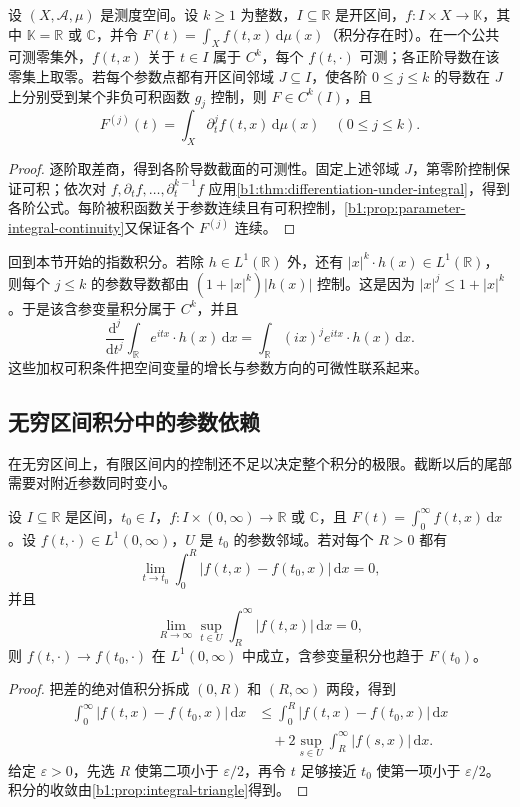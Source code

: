 \begin{corollary}
\label{b1:cor:higher-parameter-derivatives}
设 \((X,\mathcal A,\mu)\) 是测度空间。设 \(k\ge1\) 为整数，\(I\subseteq\mathbb R\) 是开区间，\(f:I\times X\to\mathbb K\)，其中 \(\mathbb K=\mathbb R\) 或 \(\mathbb C\)，并令 \(F(t)=\int_Xf(t,x)\,\mathrm d\mu(x)\)（积分存在时）。在一个公共可测零集外，\(f(t,x)\) 关于 \(t\in I\) 属于 \(C^k\)，每个 \(f(t,\cdot)\) 可测；各正阶导数在该零集上取零。若每个参数点都有开区间邻域 \(J\subseteq I\)，使各阶 \(0\leq j\leq k\) 的导数在 \(J\) 上分别受到某个非负可积函数 \(g_j\) 控制，则 \(F\in C^k(I)\)，且
\[
F^{(j)}(t)=\int_X\partial_t^j f(t,x)\,\mathrm d\mu(x)
\quad(0\leq j\leq k).
\]
\end{corollary}
\begin{proof}
逐阶取差商，得到各阶导数截面的可测性。固定上述邻域 \(J\)，第零阶控制保证可积；依次对 \(f,\partial_t f,\ldots,\partial_t^{k-1}f\) 应用\cref{b1:thm:differentiation-under-integral}，得到各阶公式。每阶被积函数关于参数连续且有可积控制，\cref{b1:prop:parameter-integral-continuity}又保证各个 \(F^{(j)}\) 连续。
\end{proof}

回到本节开始的指数积分。若除 \(h\in L^1(\mathbb R)\) 外，还有 \(|x|^k\cdot h(x)\in L^1(\mathbb R)\)，则每个 \(j\leq k\) 的参数导数都由 \((1+|x|^k)|h(x)|\) 控制。这是因为 \(|x|^j\leq1+|x|^k\)。于是该含参变量积分属于 \(C^k\)，并且
\[
\dfrac{\mathrm{d}^j}{\mathrm{d}t^j}\int_{\mathbb R}e^{itx}\cdot h(x)\,\mathrm dx
=\int_{\mathbb R}(ix)^j e^{itx}\cdot h(x)\,\mathrm dx.
\]
这些加权可积条件把空间变量的增长与参数方向的可微性联系起来。

\subsection{无穷区间积分中的参数依赖}
\label{b1:subsec:050404}

在无穷区间上，有限区间内的控制还不足以决定整个积分的极限。截断以后的尾部需要对附近参数同时变小。

\begin{proposition}
\label{b1:prop:parameter-uniform-tails}
设 \(I\subseteq\mathbb R\) 是区间，\(t_0\in I\)，\(f:I\times(0,\infty)\to\mathbb R\) 或 \(\mathbb C\)，且 \(F(t)=\int_0^\infty f(t,x)\,\mathrm dx\)。设 \(f(t,\cdot)\in L^1(0,\infty)\)，\(U\) 是 \(t_0\) 的参数邻域。若对每个 \(R>0\) 都有
\[
\lim_{t\to t_0}\int_0^R|f(t,x)-f(t_0,x)|\,\mathrm dx=0,
\]
并且
\[
\lim_{R\to\infty}\sup_{t\in U}\int_R^\infty|f(t,x)|\,\mathrm dx=0,
\]
则 \(f(t,\cdot)\to f(t_0,\cdot)\) 在 \(L^1(0,\infty)\) 中成立，含参变量积分也趋于 \(F(t_0)\)。
\end{proposition}
\begin{proof}
把差的绝对值积分拆成 \((0,R)\) 和 \((R,\infty)\) 两段，得到
\[
\begin{split}
\int_0^\infty|f(t,x)-f(t_0,x)|\,\mathrm dx
&\leq\int_0^R|f(t,x)-f(t_0,x)|\,\mathrm dx\\
&\quad+2\sup_{s\in U}\int_R^\infty|f(s,x)|\,\mathrm dx.
\end{split}
\]
给定 \(\varepsilon>0\)，先选 \(R\) 使第二项小于 \(\varepsilon/2\)，再令 \(t\) 足够接近 \(t_0\) 使第一项小于 \(\varepsilon/2\)。积分的收敛由\cref{b1:prop:integral-triangle}得到。
\end{proof}

